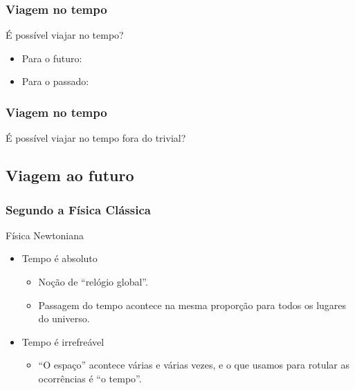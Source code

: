 \begin{frame}
    \frametitle{Viagem no tempo}

    \alert{\Large É possível viajar no tempo?}

    \begin{itemize}
        \item<3-> Para o futuro: 
        \item<3-> Para o passado: 
    \end{itemize}
\end{frame}

\begin{frame}
    \frametitle{Viagem no tempo}

    {\Large É possível viajar no tempo \alert{fora do trivial}?}

\end{frame}

\subsection{Viagem ao futuro}

\begin{frame}
    \frametitle{Segundo a Física Clássica}

    \begin{block}{Física Newtoniana}
        \begin{itemize}
            \item Tempo é absoluto
            \begin{itemize}
                \item Noção de ``relógio global''.
                \item Passagem do tempo acontece na mesma proporção para todos os lugares do universo.
            \end{itemize}
            \item Tempo é irrefreável
            \begin{itemize}
                \item ``O espaço'' acontece várias e várias vezes, e o que usamos para rotular as ocorrências é ``o tempo''.
            \end{itemize}
        \end{itemize}
    \end{block}
\end{frame}

